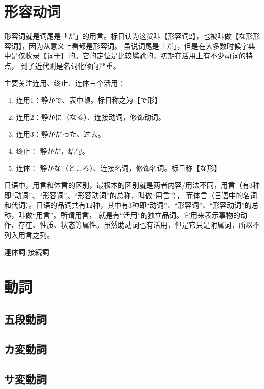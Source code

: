 \section{形容动词}

形容词就是词尾是「だ」的用言。标日认为这货叫【形容词2】，也被叫做【な形形容词】，因为从意义上看都是形容词。
虽说词尾是「だ」，但是在大多数时候字典中是仅收录【词干】的。它的定位是比较尴尬的，初期在活用上有不少动词的特点，
到了近代则是名词化倾向严重。


主要关注连用、终止、连体三个活用：
\begin{enumerate}
    \item 连用1：静かで、表中顿。标日称之为【で形】
    \item 连用2：静かに（なる）、连接动词，修饰动词。
    \item 连用3：静かだった、过去。
    \item 终止： 静かだ，结句。
    \item 连体： 静かな（ところ）、连接名词，修饰名词。标日称【な形】
\end{enumerate}

日语中，用言和体言的区别，最根本的区别就是两者内容/用法不同，用言（有3种即“动词”、“形容词”、“形容动词”的总称，叫做“用言”），
而体言（日语中的名词和代词）。日语的品词共有12种，其中有3种即“动词”、“形容词”、“形容动词”的总称，叫做“用言”。所谓用言，
就是有“活用”的独立品词。它用来表示事物的动作、存在、性质、状态等属性。虽然助动词也有活用，但是它只是附属词，所以不列入用言之列。

連体詞
接続詞

\section{動詞}

\newpage

\subsection{五段動詞}

\newpage

\subsection{カ変動詞}

\newpage

\subsection{サ変動詞}

